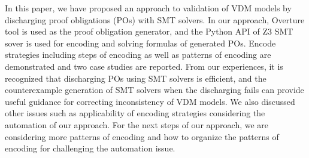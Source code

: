 In this paper, we have proposed an approach to validation of VDM models by discharging proof obligations (POs) with SMT solvers. In our approach, Overture tool is used as the proof obligation generator, and the Python API of Z3 SMT sover is used for encoding and solving formulas of generated POs. Encode strategies including steps of encoding as well as patterns of encoding are demonstrated and two case studies are reported. From our experiences, it is recognized that discharging POs using SMT solvers is efficient, and the counterexample generation of SMT solvers when the discharging fails can provide useful guidance for correcting inconsistency of VDM models. We also discussed other issues such as applicability of encoding strategies considering the automation of our approach. For the next steps of our approach, we are considering more patterns of encoding and how to organize the patterns of encoding for challenging the automation issue. 
